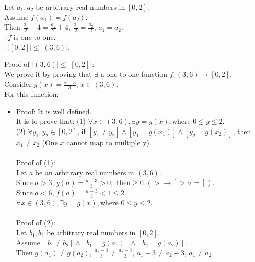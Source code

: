 \documentclass[12pt]{exam}
\begin{document}
\begin{solution}
\begin{qparts}
\begin{itemize}
            Let $a_1, a_2$ be arbitrary real numbers in $[0,2]$.\\
            Assume $f(a_1) = f(a_2)$.\\
            Then $\frac{a_1}{2} + 4 = \frac{a_2}{2} + 4$, 
            $\frac{a_1}{2} = \frac{a_2}{2}$, $a_1 = a_2$.\\
            $\therefore f$ is one-to-one.\\
            $\therefore |[0,2]| \leq |(3,6)|$.
        \end{itemize}
        \item Proof of $|(3,6)| \leq |[0,2]|$:\\
        We prove it by proving that $\exists$ a one-to-one function $f: (3,6) \rightarrow [0,2]$.
        \\ Consider $g(x) = \frac{x-3}{3}$, $x \in (3,6)$.\\
        For this function:
        \begin{itemize}
            \item Proof: It is well defined.
            \\It is to prove that: (1) $\forall x \in (3,6), \exists y = g(x), $where $ 0 \leq y \leq 2$.\\
            (2) $\forall y_1, y_2 \in [0,2]$, if 
            $[y_1 \not = y_2] \land [y_1 = g(x_1)] \land [y_2 = g(x_2)]$, then $x_1 \not = x_2$ (One $x$ cannot map to multiple y).
            \\\\
            Proof of (1):\\
            Let $a$ be an arbitrary real numbers in $(3,6)$.\\
            Since $a > 3$, $g(a) = \frac{a - 3}{3} > 0, $ then$ \geq 0$ $(> \rightarrow [> \lor =])$.\\
            Since $a < 6$, $f(a) = \frac{a - 3}{3} < 1 \leq 2$.\\
            $\forall x \in (3,6), \exists y = g(x), $where $ 0 \leq y \leq 2$.\\\\
            Proof of (2): \\
            Let $b_1, b_2$ be arbitrary real numbers in $[0,2]$.\\
            Assume $[b_1 \not = b_2] \land [b_1 = g(a_1)] \land [b_2 = g(a_2)]$.
            \\Then $g(a_1) \not = g(a_2)$, $\frac{a_1 - 3}{3} \not = \frac{a_2 - 3}{3}$, $a_1 -3 \not = a_2 - 3$, $a_1 \not = a_2$.\\

\end{itemize}
\end{qparts}
\end{solution}
\end{document}
